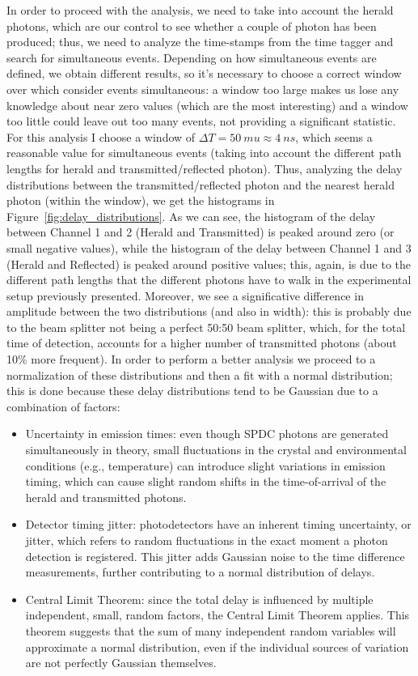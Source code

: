 \documentclass[prl,twocolumn]{revtex4-1}
\begin{document}
In order to proceed with the analysis, we need to take into account the herald photons, which are our control to see whether a couple of photon has been produced; thus, we need to analyze the time-stamps from the time tagger and search for simultaneous events. Depending on how simultaneous events are defined, we obtain different results, so it's necessary to choose a correct window over which consider events simultaneous: a window too large makes us lose any knowledge about near zero values (which are the most interesting) and a window too little could leave out too many events, not providing a significant statistic.
For this analysis I choose a window of $\Delta T = 50 \: mu \approx 4 \: ns$, which seems a reasonable value for simultaneous events (taking into account the different path lengths for herald and transmitted/reflected photon). Thus, analyzing the delay distributions between the transmitted/reflected photon and the nearest herald photon (within the window), we get the histograms in Figure~\ref{fig:delay_distributions}. As we can see, the histogram of the delay between Channel 1 and 2 (Herald and Transmitted) is peaked around zero (or small negative values), while the histogram of the delay between Channel 1 and 3 (Herald and Reflected) is peaked around positive values; this, again, is due to the different path lengths that the different photons have to walk in the experimental setup previously presented. Moreover, we see a significative difference in amplitude between the two distributions (and also in width): this is probably due to the beam splitter not being a perfect 50:50 beam splitter, which, for the total time of detection, accounts for a higher number of transmitted photons (about 10\% more frequent). In order to perform a better analysis we proceed to a normalization of these distributions and then a fit with a normal distribution; this is done because these delay distributions tend to be Gaussian due to a combination of factors:
\begin{itemize}
    \item Uncertainty in emission times: even though SPDC photons are generated simultaneously in theory, small fluctuations in the crystal and environmental conditions (e.g., temperature) can introduce slight variations in emission timing,  which can cause slight random shifts in the time-of-arrival of the herald and transmitted photons.
    \item Detector timing jitter: photodetectors have an inherent timing uncertainty, or jitter, which refers to random fluctuations in the exact moment a photon detection is registered. This jitter adds Gaussian noise to the time difference measurements, further contributing to a normal distribution of delays.
    \item Central Limit Theorem: since the total delay is influenced by multiple independent, small, random factors, the Central Limit Theorem applies. This theorem suggests that the sum of many independent random variables will approximate a normal distribution, even if the individual sources of variation are not perfectly Gaussian themselves.
\end{itemize}
\end{document}
